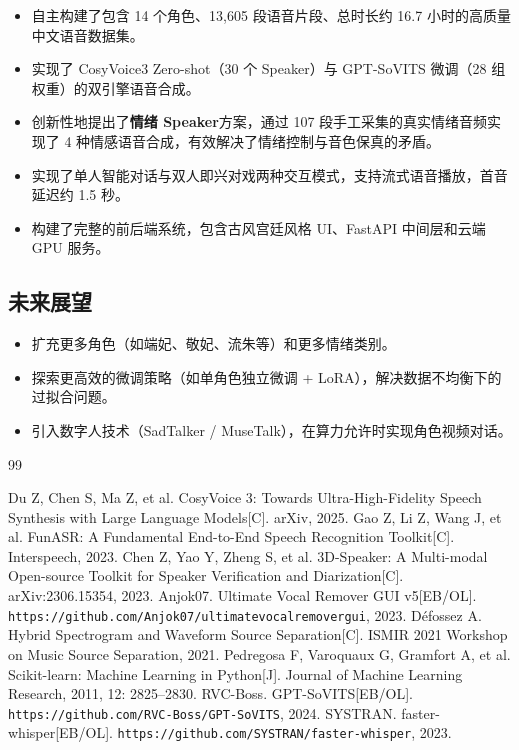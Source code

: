 \documentclass[12pt,a4paper]{article}
\begin{document}
\begin{itemize}[leftmargin=2em]
    \item 自主构建了包含 14 个角色、13,605 段语音片段、总时长约 16.7 小时的高质量中文语音数据集。
    \item 实现了 CosyVoice3 Zero-shot（30 个 Speaker）与 GPT-SoVITS 微调（28 组权重）的双引擎语音合成。
    \item 创新性地提出了\textbf{情绪 Speaker}方案，通过 107 段手工采集的真实情绪音频实现了 4 种情感语音合成，有效解决了情绪控制与音色保真的矛盾。
    \item 实现了单人智能对话与双人即兴对戏两种交互模式，支持流式语音播放，首音延迟约 1.5 秒。
    \item 构建了完整的前后端系统，包含古风宫廷风格 UI、FastAPI 中间层和云端 GPU 服务。
\end{itemize}

\subsection{未来展望}

\begin{itemize}[leftmargin=2em]
    \item 扩充更多角色（如端妃、敬妃、流朱等）和更多情绪类别。
    \item 探索更高效的微调策略（如单角色独立微调 + LoRA），解决数据不均衡下的过拟合问题。
    \item 引入数字人技术（SadTalker / MuseTalk），在算力允许时实现角色视频对话。
\end{itemize}

\newpage
{}
{}

\begin{thebibliography}{99}

 Du Z, Chen S, Ma Z, et al. CosyVoice 3: Towards Ultra-High-Fidelity Speech Synthesis with Large Language Models[C]. arXiv, 2025.
 Gao Z, Li Z, Wang J, et al. FunASR: A Fundamental End-to-End Speech Recognition Toolkit[C]. Interspeech, 2023.
 Chen Z, Yao Y, Zheng S, et al. 3D-Speaker: A Multi-modal Open-source Toolkit for Speaker Verification and Diarization[C]. arXiv:2306.15354, 2023.
 Anjok07. Ultimate Vocal Remover GUI v5[EB/OL]. \texttt{https://github.com/Anjok07/ultimatevocalremovergui}, 2023.
 Défossez A. Hybrid Spectrogram and Waveform Source Separation[C]. ISMIR 2021 Workshop on Music Source Separation, 2021.
 Pedregosa F, Varoquaux G, Gramfort A, et al. Scikit-learn: Machine Learning in Python[J]. Journal of Machine Learning Research, 2011, 12: 2825--2830.
 RVC-Boss. GPT-SoVITS[EB/OL]. \texttt{https://github.com/RVC-Boss/GPT-SoVITS}, 2024.
 SYSTRAN. faster-whisper[EB/OL]. \texttt{https://github.com/SYSTRAN/faster-whisper}, 2023.

\end{thebibliography}
\end{document}
